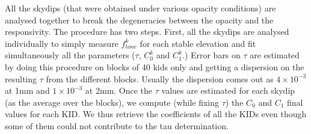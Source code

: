 All the skydips (that were obtained under various opacity
conditions) are analysed together to break the degeneracies between
the opacity and the responsivity. The procedure has two steps.
First, all the skydips are analysed individually to simply measure
$f_{tone}^k$ for each stable elevation and fit simultaneously all the
parameters ($\tau$, $C_0^k$ and $C_1^k$.)
Error bars on $\tau$ are estimated by doing
this procedure on blocks of 40 kids only and getting a dispersion on the
resulting $\tau$ from the different blocks. Usually the dispersion comes out as
$4\times 10^{-3}$ at 1mm and $1\times 10^{-3}$ at 2mm. Once the $\tau$ values
are estimated for each skydip (as the average over the blocks), we compute
(while fixing $\tau$) the $C_0$ and $C_1$ final values for each KID. We thus
retrieve the coefficients of all the KIDs even though some of them could not
contribute to the tau determination.



